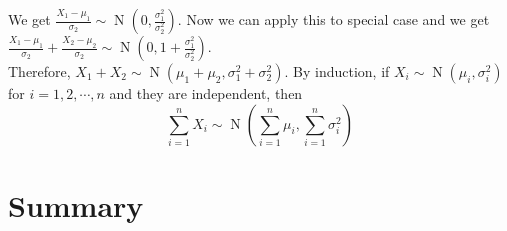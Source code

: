 \documentclass{huhtakm-template-book}
\DeclareMathOperator{\N}{N}
\begin{document}
\begin{proofing}
        We get $\frac{X_{1}-\mu_{1}}{\sigma_{2}}\sim\N\left(0,\frac{\sigma_{1}^{2}}{\sigma_{2}^{2}}\right)$. Now we can apply this to special case and we get $\frac{X_{1}-\mu_{1}}{\sigma_{2}}+\frac{X_{2}-\mu_{2}}{\sigma_{2}}\sim\N\left(0,1+\frac{\sigma_{1}^{2}}{\sigma_{2}^{2}}\right)$.\\
        Therefore, $X_{1}+X_{2}\sim\N(\mu_{1}+\mu_{2},\sigma_{1}^{2}+\sigma_{2}^{2})$. By induction, if $X_{i}\sim\N(\mu_{i},\sigma_{i}^{2})$ for $i=1,2,\cdots,n$ and they are independent, then
        \begin{equation*}
            \sum_{i=1}^{n}X_{i}\sim\N\left(\sum_{i=1}^{n}\mu_{i},\sum_{i=1}^{n}\sigma_{i}^{2}\right)
        \end{equation*}
    \end{proofing}

\chapter*{Summary}
\end{document}
